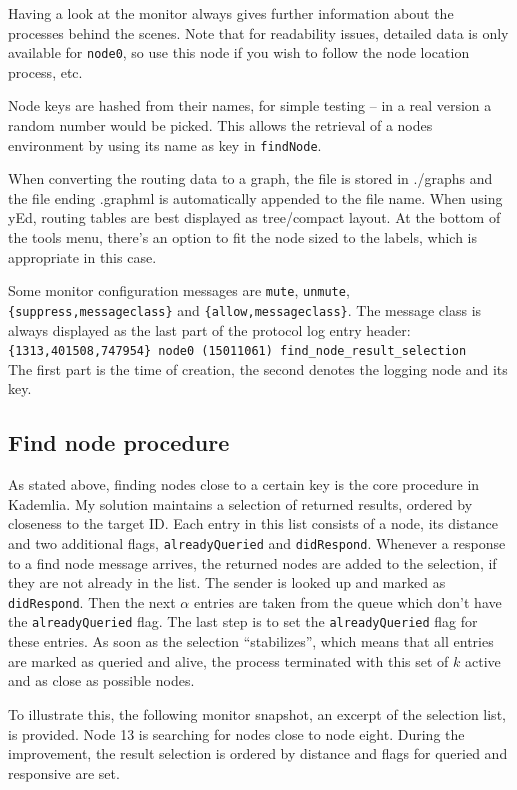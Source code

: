 \documentclass[a4paper,10pt,notitlepage]{article}
\begin{document}
Having a look at the monitor always gives further information about the processes behind the scenes.
Note that for readability issues, detailed data is only available for \texttt{node0}, so use this node if you wish to follow the node location process, etc.

Node keys are hashed from their names, for simple testing -- in a real version a random number would be picked.
This allows the retrieval of a nodes environment by using its name as key in \texttt{findNode}.

When converting the routing data to a graph, the file is stored in ./graphs and the file ending .graphml is automatically appended to the file name.
When using yEd, routing tables are best displayed as tree/compact layout.
At the bottom of the tools menu, there's an option to fit the node sized to the labels, which is appropriate in this case.

Some monitor configuration messages are \texttt{mute}, \texttt{unmute}, \texttt{\{suppress,messageclass\}} and  \texttt{\{allow,messageclass\}}.
The message class is always displayed as the last part of the protocol log entry header:\\
\texttt{\{1313,401508,747954\}    node0 (15011061) find\_node\_result\_selection}\\
The first part is the time of creation, the second denotes the logging node and its key.
\subsection{Find node procedure}
As stated above, finding nodes close to a certain key is the core procedure in Kademlia.
My solution maintains a selection of returned results, ordered by closeness to the target ID. 
Each entry in this list consists of a node, its distance and two additional flags, \texttt{alreadyQueried} and \texttt{didRespond}.
Whenever a response to a find node message arrives, the returned nodes are added to the selection, if they are not already in the list.
The sender is looked up and marked as \texttt{didRespond}.
Then the next $\alpha$ entries are taken from the queue which don't have the \texttt{alreadyQueried} flag.
The last step is to set the \texttt{alreadyQueried} flag for these entries.
As soon as the selection ``stabilizes'', which means that all entries are marked as queried and alive, the process terminated with this set of $k$ active and as close as possible nodes.

To illustrate this, the following monitor snapshot, an excerpt of the selection list, is provided.
Node 13 is searching for nodes close to node eight.
During the improvement, the result selection is ordered by distance and flags for queried and responsive are set.
\end{document}
